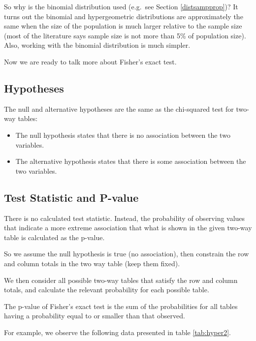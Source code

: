 \documentclass[
]{book}
\providecommand{\tightlist}{%
  \setlength{\itemsep}{0pt}\setlength{\parskip}{0pt}}
\theoremstyle{definition}
\theoremstyle{definition}
\theoremstyle{definition}
\theoremstyle{definition}
\theoremstyle{remark}
\begin{document}
So why is the binomial distribution used (e.g.~see Section \ref{distsampprop})? It turns out the binomial and hypergeometric distributions are approximately the same when the size of the population is much larger relative to the sample size (most of the literature says sample size is not more than 5\% of population size). Also, working with the binomial distribution is much simpler.

Now we are ready to talk more about Fisher's exact test.

\hypertarget{hypotheses-5}{%
\subsection{Hypotheses}\label{hypotheses-5}}

The null and alternative hypotheses are the same as the chi-squared test for two-way tables:

\begin{itemize}
\tightlist
\item
  The null hypothesis states that there is no association between the two variables.
\item
  The alternative hypothesis states that there is some association between the two variables.
\end{itemize}

\hypertarget{test-statistic-and-p-value}{%
\subsection{Test Statistic and P-value}\label{test-statistic-and-p-value}}

There is no calculated test statistic. Instead, the probability of observing values that indicate a more extreme association that what is shown in the given two-way table is calculated as the p-value.

So we assume the null hypothesis is true (no association), then constrain the row and column totals in the two way table (keep them fixed).

We then consider all possible two-way tables that satisfy the row and column totals, and calculate the relevant probability for each possible table.

The p-value of Fisher's exact test is the sum of the probabilities for all tables having a probability equal to or smaller than that observed.

For example, we observe the following data presented in table \ref{tab:hyper2}.
\end{document}
